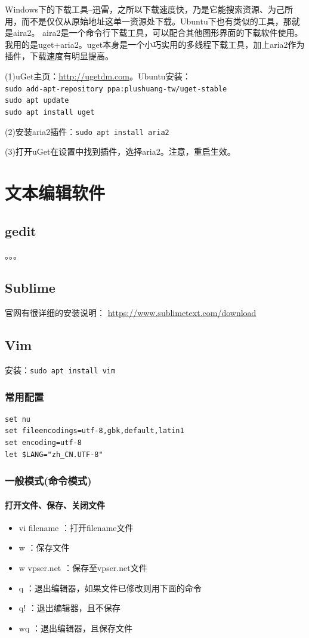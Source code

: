 Windows下的下载工具--迅雷，之所以下载速度快，乃是它能搜索资源、为己所用，而不是仅仅从原始地址这单一资源处下载。Ubuntu下也有类似的工具，那就是aira2。
aira2是一个命令行下载工具，可以配合其他图形界面的下载软件使用。我用的是uget+aria2。uget本身是一个小巧实用的多线程下载工具，加上aria2作为插件，下载速度有明显提高。

(1)uGet主页：\url{http://ugetdm.com}。Ubuntu安装：\\
\verb|sudo add-apt-repository ppa:plushuang-tw/uget-stable|\\
\verb|sudo apt update|\\
\verb|sudo apt install uget|

(2)安装aria2插件：\verb|sudo apt install aria2|

(3)打开uGet在设置中找到插件，选择aria2。注意，重启生效。





\section{文本编辑软件}
\subsection{gedit}
。。。


\subsection{Sublime}
官网有很详细的安装说明：
\url{https://www.sublimetext.com/download}

\subsection{Vim}
安装：\verb|sudo apt install vim|

\subsubsection{常用配置}
\begin{verbatim}
set nu
set fileencodings=utf-8,gbk,default,latin1
set encoding=utf-8
let $LANG="zh_CN.UTF-8"
\end{verbatim}


\subsubsection{一般模式(命令模式)}
\paragraph{打开文件、保存、关闭文件}
\begin{itemize}
\item vi filename ：打开filename文件
\item w ：保存文件
\item w vpser.net ：保存至vpser.net文件
\item q ：退出编辑器，如果文件已修改则用下面的命令
\item q! ：退出编辑器，且不保存
\item wq ：退出编辑器，且保存文件
\end{itemize}


